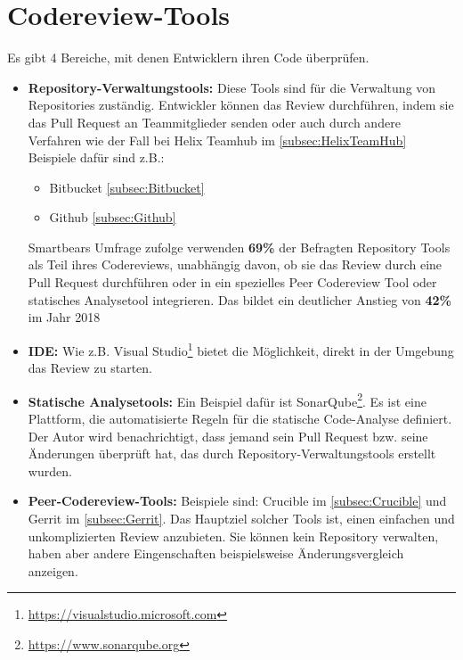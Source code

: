 \pagebreak

\section{Codereview-Tools}
\label{sec:Coderview-Tools}

Es gibt 4 Bereiche, mit denen Entwicklern ihren Code überprüfen.

\begin{itemize}
	\item \textbf{Repository-Verwaltungstools:} Diese Tools sind für die Verwaltung von Repositories zuständig. Entwickler können das Review durchführen, indem sie das Pull Request an
		Teammitglieder senden oder auch durch andere Verfahren wie der Fall bei Helix Teamhub im \cref{subsec:HelixTeamHub}
		Beispiele dafür sind z.B.:
		\begin{itemize}
			\item Bitbucket \cref{subsec:Bitbucket}
			\item Github \cref{subsec:Github}
		\end{itemize}
	
		Smartbears Umfrage zufolge verwenden \textbf{69\%} der Befragten Repository Tools als Teil ihres Codereviews, unabhängig davon, ob sie das Review durch eine Pull Request 					durchführen oder in ein spezielles Peer Codereview Tool oder statisches Analysetool integrieren. Das bildet ein deutlicher Anstieg von \textbf{42\%} im Jahr 2018 							\cite{smartbear}

	\item \textbf{\ac{IDE}:} Wie z.B. Visual Studio\footnote{\url{https://visualstudio.microsoft.com}} bietet die Möglichkeit, direkt in der Umgebung das Review zu starten.

	\item \textbf{Statische Analysetools:} Ein Beispiel dafür ist SonarQube\footnote{\url{https://www.sonarqube.org}}. Es ist eine Plattform, die automatisierte Regeln für die statische Code-Analyse definiert. Der Autor wird benachrichtigt, dass jemand sein Pull Request bzw. seine Änderungen überprüft hat, das durch Repository-Verwaltungstools erstellt wurden.

	\item \textbf{Peer-Codereview-Tools:} Beispiele sind: Crucible im \cref{subsec:Crucible} und Gerrit im \cref{subsec:Gerrit}. Das Hauptziel solcher Tools ist, einen einfachen und 				unkomplizierten Review anzubieten. Sie können kein Repository verwalten, haben aber andere Eingenschaften beispielsweise Änderungsvergleich anzeigen.
\end{itemize}

